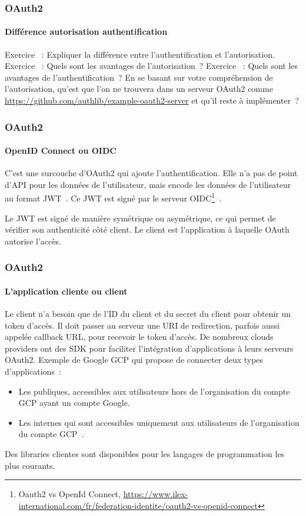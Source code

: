 \documentclass{beamer}
\begin{document}
    \begin{frame}
        \frametitle{OAuth2}
        \framesubtitle{Différence autorisation authentification}
        \transdissolve
        Exercice \execcounterdispinc{}~:
        Expliquer la différence entre l'authentification et l'autorisation.
        \bigbreak
        Exercice \execcounterdispinc{}~:
        Quels sont les avantages de l'autorisation~?
        \bigbreak
        Exercice \execcounterdispinc{}~:
        Quels sont les avantages de l'authentification~?
        En se basant sur votre compréhension de l'autorisation, qu'est que l'on ne trouvera dans un serveur OAuth2 comme \url{https://github.com/authlib/example-oauth2-server} et qu'il reste à implémenter~?
    \end{frame}

    \begin{frame}
        \frametitle{OAuth2}
        \framesubtitle{OpenID Connect ou OIDC}
        \transdissolve
        C'est une surcouche d'OAuth2 qui ajoute l'authentification.
        Elle n'a pas de point d'API pour les données de l'utilisateur, mais encode les données de l'utilisateur au format JWT~.
        Ce JWT est signé par le serveur OIDC\footnote{Oauth2 vs OpenId Connect, \url{https://www.ilex-international.com/fr/federation-identite/oauth2-vs-openid-connect}}~.

        Le JWT est signé de manière symétrique ou asymétrique, ce qui permet de vérifier son authenticité côté client.
        \bigbreak
        Le client est l'application à laquelle OAuth autorise l'accès.
    \end{frame}

    \begin{frame}
        \frametitle{OAuth2}
        \framesubtitle{L'application cliente ou client}
        \transdissolve
        Le client n'a besoin que de l'ID du client et du secret du client pour obtenir un token d'accès.
        \bigbreak
        Il doit passer au serveur une URI de redirection, parfois aussi appelée callback URL, pour recevoir le token d'accès.
        \bigbreak
        De nombreux clouds providers ont des SDK pour faciliter l'intégration d'applications à leurs serveurs OAuth2.
        \bigbreak
        Exemple de Google GCP qui propose de connecter deux types d'applications~:
        \begin{itemize}
            \item Les publiques, accessibles aux utilisateurs hors de l'organisation du compte GCP ayant un compte Google.
            \item Les internes qui sont accessibles uniquement aux utilisateurs de l'organisation du compte GCP~.
        \end{itemize}
        Des libraries clientes sont disponibles pour les langages de programmation les plus courants.
    \end{frame}
\end{document}
